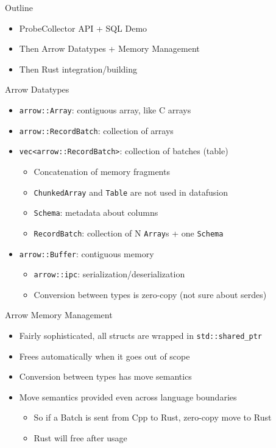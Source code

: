 \documentclass[]{beamer}
\begin{document}
\begin{frame}{Outline}
  \begin{itemize}
    \item ProbeCollector API + SQL Demo
    \item Then Arrow Datatypes + Memory Management
    \item Then Rust integration/building
  \end{itemize}
\end{frame}


\begin{frame}[fragile]{Arrow Datatypes}
  \begin{itemize}
    \item \verb|arrow::Array|: contiguous array, like C arrays
      \pause
    \item \verb|arrow::RecordBatch|: collection of arrays
      \pause
    \item \verb|vec<arrow::RecordBatch>|: collection of batches (table)
      \pause
      \begin{itemize}
        \item Concatenation of memory fragments
        \item \verb|ChunkedArray| and \verb|Table| are not used in datafusion
        \item \verb|Schema|: metadata about columns
        \item \verb|RecordBatch|: collection of N \verb|Array|s + one \verb|Schema|
      \end{itemize}
    \item \verb|arrow::Buffer|: contiguous memory
      \begin{itemize}
        \item \verb|arrow::ipc|: serialization/deserialization
        \item Conversion between types is zero-copy (not sure about serdes)
      \end{itemize}
  \end{itemize}
\end{frame}

\begin{frame}[fragile]{Arrow Memory Management}
  \begin{itemize}
    \item Fairly sophisticated, all structs are wrapped in \verb|std::shared_ptr| 
    \item Frees automatically when it goes out of scope
    \item Conversion between types has move semantics
    \item Move semantics provided even across language boundaries
      \begin{itemize}
        \item So if a Batch is sent from Cpp to Rust, zero-copy move to Rust
        \item Rust will free after usage
      \end{itemize}
  \end{itemize}
\end{frame}
\end{document}
